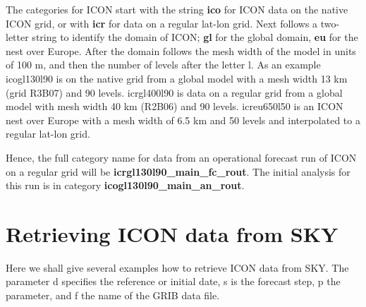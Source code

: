 The categories for ICON start with the string \textbf{ico} for ICON data on the native
ICON grid, or with \textbf{icr} for data on a regular lat-lon grid.
Next follows a two-letter string to identify the domain of ICON; \textbf{gl} for the
global domain, \textbf{eu} for the nest over Europe. After the domain follows the
mesh width of the model in units of 100 m, and then the number of levels after the
letter l. As an example icogl130l90 is on the native grid from a global model with a mesh width
13 km (grid R3B07) and 90 levels. icrgl400l90 is data on a regular grid from a global model with
mesh width 40 km (R2B06) and 90 levels. icreu650l50 is an ICON nest over Europe with a
mesh width of 6.5 km and 50 levels and interpolated to a regular lat-lon grid.

Hence, the full category name for data from an operational forecast run of ICON on a
regular grid will be \textbf{icrgl130l90\_main\_fc\_rout}. The initial analysis for this
run is in category \textbf{icogl130l90\_main\_an\_rout}.

\section{Retrieving ICON data from SKY}

Here we shall give several examples how to retrieve ICON data from SKY.
The parameter d specifies the reference or initial date, s is the forecast step, p the parameter,
and f the name of the GRIB data file.

